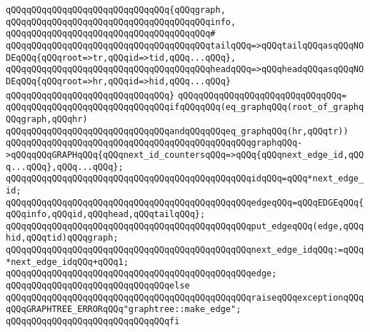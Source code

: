 \verb|qQQqqQQqqQQqqQQqqQQqqQQqqQQqqQQq{qQQqgraph,|\newline
\verb|qQQqqQQqqQQqqQQqqQQqqQQqqQQqqQQqqQQqqQQqinfo,|\newline
\verb|qQQqqQQqqQQqqQQqqQQqqQQqqQQqqQQqqQQqqQQq#|\newline
\verb|qQQqqQQqqQQqqQQqqQQqqQQqqQQqqQQqqQQqqQQqtailqQQq=>qQQqtailqQQqasqQQqNODEqQQq{qQQqroot=>tr,qQQqid=>tid,qQQq...qQQq},|\newline
\verb|qQQqqQQqqQQqqQQqqQQqqQQqqQQqqQQqqQQqqQQqheadqQQq=>qQQqheadqQQqasqQQqNODEqQQq{qQQqroot=>hr,qQQqid=>hid,qQQq...qQQq}|\newline
\verb|qQQqqQQqqQQqqQQqqQQqqQQqqQQqqQQq}|\newline
\verb|qQQqqQQqqQQqqQQqqQQqqQQqqQQqqQQq=|\newline
\verb|qQQqqQQqqQQqqQQqqQQqqQQqqQQqqQQqifqQQqqQQq(eq_graphqQQq(root_of_graphqQQqgraph,qQQqhr)|\newline
\verb|qQQqqQQqqQQqqQQqqQQqqQQqqQQqqQQqandqQQqqQQqeq_graphqQQq(hr,qQQqtr))|\newline
\newline
\verb|qQQqqQQqqQQqqQQqqQQqqQQqqQQqqQQqqQQqqQQqqQQqqQQqgraphqQQq->qQQqqQQqGRAPHqQQq{qQQqnext_id_countersqQQq=>qQQq{qQQqnext_edge_id,qQQq...qQQq},qQQq...qQQq};|\newline
\newline
\verb|qQQqqQQqqQQqqQQqqQQqqQQqqQQqqQQqqQQqqQQqqQQqqQQqidqQQq=qQQq*next_edge_id;|\newline
\newline
\verb|qQQqqQQqqQQqqQQqqQQqqQQqqQQqqQQqqQQqqQQqqQQqqQQqedgeqQQq=qQQqEDGEqQQq{qQQqinfo,qQQqid,qQQqhead,qQQqtailqQQq};|\newline
\newline
\verb|qQQqqQQqqQQqqQQqqQQqqQQqqQQqqQQqqQQqqQQqqQQqqQQqput_edgeqQQq(edge,qQQqhid,qQQqtid)qQQqgraph;|\newline
\newline
\verb|qQQqqQQqqQQqqQQqqQQqqQQqqQQqqQQqqQQqqQQqqQQqqQQqnext_edge_idqQQq:=qQQq*next_edge_idqQQq+qQQq1;|\newline
\newline
\verb|qQQqqQQqqQQqqQQqqQQqqQQqqQQqqQQqqQQqqQQqqQQqqQQqedge;|\newline
\newline
\verb|qQQqqQQqqQQqqQQqqQQqqQQqqQQqqQQqelse|\newline
\verb|qQQqqQQqqQQqqQQqqQQqqQQqqQQqqQQqqQQqqQQqqQQqqQQqraiseqQQqexceptionqQQqqQQqGRAPHTREE_ERRORqQQq"graphtree::make_edge";|\newline
\verb|qQQqqQQqqQQqqQQqqQQqqQQqqQQqqQQqfi|\newline
